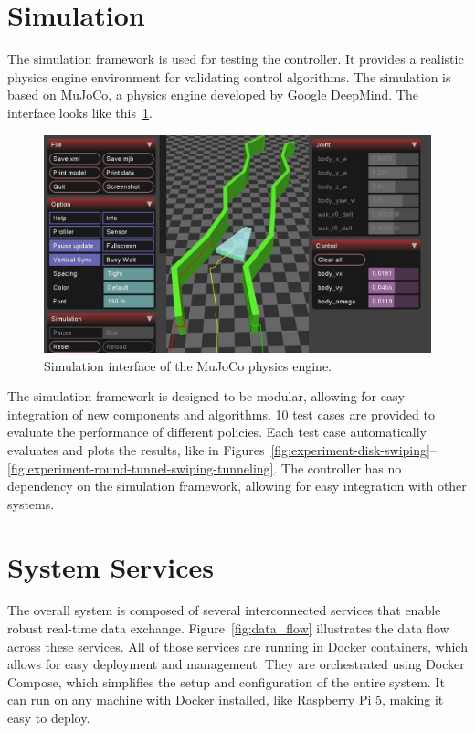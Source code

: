 \section{Simulation}
The simulation framework is used for testing the controller.
It provides a realistic physics engine environment for validating control algorithms.
The simulation is based on MuJoCo, a physics engine developed by Google DeepMind.
The interface looks like this~\cref{fig:mujoco}.

\begin{figure}
    \centering
    \includegraphics[width=\textwidth]{figures/mujoco}
    \caption{Simulation interface of the MuJoCo physics engine.}
    \label{fig:mujoco}
\end{figure}

The simulation framework is designed to be modular, allowing for easy integration of new components and algorithms.
10 test cases are provided to evaluate the performance of different policies.
Each test case automatically evaluates and plots the results, like in Figures~\ref{fig:experiment-disk-swiping}--\ref{fig:experiment-round-tunnel-swiping-tunneling}.
The controller has no dependency on the simulation framework, allowing for easy integration with other systems.


\section{System Services}
The overall system is composed of several interconnected services that enable robust real-time data exchange.
Figure~\ref{fig:data_flow} illustrates the data flow across these services.
All of those services are running in Docker containers, which allows for easy deployment and management.
They are orchestrated using Docker Compose, which simplifies the setup and configuration of the entire system.
It can run on any machine with Docker installed, like Raspberry Pi 5, making it easy to deploy.

